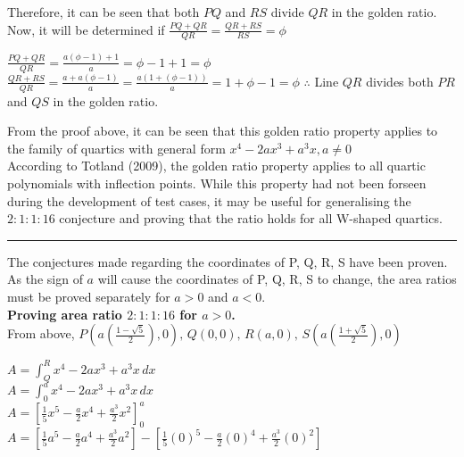 \documentclass{homework}
\begin{document}
\begin{flushleft}
    Therefore, it can be seen that both $PQ$ and $RS$ divide $QR$ in the golden ratio. Now, it will be determined if $\frac{PQ+QR}{QR}=\frac{QR+RS}{RS}=\phi$
\begin{paracol}{2}
    $\frac{PQ+QR}{QR}=\frac{a(\phi-1)+1}{a}=\phi-1+1=\phi$ \\
    $\frac{QR+RS}{QR}=\frac{a+a(\phi-1)}{a}=\frac{a(1+(\phi-1))}{a}=1+\phi-1=\phi$ 
\switchcolumn
    $\therefore$ Line $QR$ divides both $PR$ and $QS$ in the golden ratio. \\
\end{paracol} 
\vspace{1.4em}
    From the proof above, it can be seen that this golden ratio property applies to the family of quartics with general form $x^4-2ax^3+a^3x, a\neq0$ \\\vspace{0.8em}
    According to Totland (2009), the golden ratio property applies to all quartic polynomials with inflection points. 
    While this property had not been forseen during the development of test cases, it may be useful for generalising the $2:1:1:16$ conjecture and proving that the ratio holds for all W-shaped quartics. \\ 
    \rule{45em}{0.2pt}   $    $  \vspace{0.7em} \\
    The conjectures made regarding the coordinates of P, Q, R, S have been proven. \\ As the sign of $a$ will cause the coordinates of P, Q, R, S to change, the area ratios must be proved separately for $a>0$ and $a<0$. \vspace{1.8em}\\ 
    \textbf{Proving area ratio $2:1:1:16$ for $a>0$.} \vspace{0.7em} \\
    From above, $P(a(\frac{1 - \sqrt{5}}{2}),0), \, Q(0,0), \, R(a,0), \, S(a(\frac{1 + \sqrt{5}}{2}),0)$ \vspace{0.5em} \\
\begin{paracol}{2}
$A=\int_Q^Rx^4-2ax^3+a^3x\, dx$ \vspace{0.5em}\\
$A=\int_0^ax^4-2ax^3+a^3x\, dx$ \vspace{0.5em}\\
$A=[\frac{1}{5}x^5-\frac{a}{2}x^4+\frac{a^3}{2}x^2]_0^a$ \vspace{0.5em} \\
$A=[\frac{1}{5}a^5-\frac{a}{2}a^4+\frac{a^3}{2}a^2]-[\frac{1}{5}(0)^5-\frac{a}{2}(0)^4+\frac{a^3}{2}(0)^2]$ \vspace{0.5em} \\

\end{paracol}
\end{flushleft}
\end{document}

